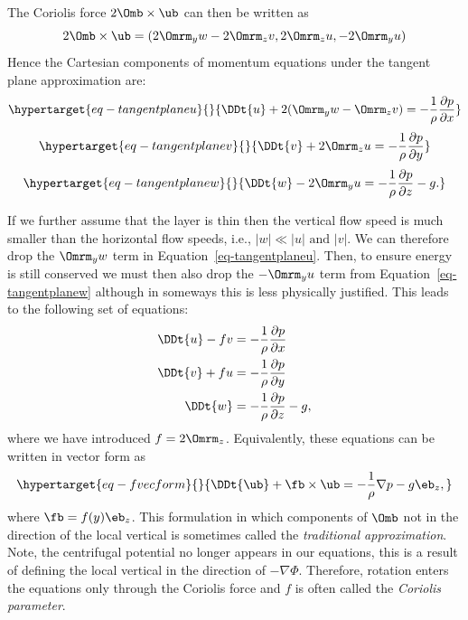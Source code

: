 \documentclass[
  letterpaper,
  twocolumn,
  landscape]{report}
\begin{document}
The Coriolis force \(2\Omb\times \ub\) can then be written as \[
2\Omb\times \ub = (2\Omrm_y w - 2\Omrm_z v, 2\Omrm_z u, -2\Omrm_y u)
\] Hence the Cartesian components of momentum equations under the
tangent plane approximation are:
\begin{equation}\protect\hypertarget{eq-tangentplaneu}{}{ \DDt{u} + 2(\Omrm_yw-\Omrm_zv) = -\frac{1}{\rho}\frac{\partial p}{\partial x} }\label{eq-tangentplaneu}\end{equation}
\begin{equation}\protect\hypertarget{eq-tangentplanev}{}{ \DDt{v} + 2\Omrm_z u = -\frac{1}{\rho}\frac{\partial p}{\partial y} }\label{eq-tangentplanev}\end{equation}
\begin{equation}\protect\hypertarget{eq-tangentplanew}{}{\DDt{w}  -2\Omrm_y u = -\frac{1}{\rho}\frac{\partial p}{\partial z} -g. }\label{eq-tangentplanew}\end{equation}

If we further assume that the layer is thin then the vertical flow speed
is much smaller than the horizontal flow speeds, i.e.,
\(|w| \ll |u| \text{ and } |v|\). We can therefore drop the
\(\Omrm_y w\) term in Equation~\ref{eq-tangentplaneu}. Then, to ensure
energy is still conserved we must then also drop the \(-\Omrm_y u\) term
from Equation~\ref{eq-tangentplanew} although in someways this is less
physically justified. This leads to the following set of equations:
\begin{align}
\DDt{u} -fv &= -\frac{1}{\rho}\frac{\partial p}{\partial x} \\
\DDt{v} + fu &= -\frac{1}{\rho}\frac{\partial p}{\partial y} \\
\DDt{w}   &= -\frac{1}{\rho}\frac{\partial p}{\partial z} -g,
\end{align} where we have introduced \(f=2\Omrm_z\). Equivalently, these
equations can be written in vector form as
\begin{equation}\protect\hypertarget{eq-fvecform}{}{
\DDt{\ub} + \fb\times\ub = -\frac{1}{\rho}\nabla p -g\eb_z,
}\label{eq-fvecform}\end{equation} where \(\fb=f(y)\eb_z\). This
formulation in which components of \(\Omb\) not in the direction of the
local vertical is sometimes called the \emph{traditional approximation}.
Note, the centrifugal potential no longer appears in our equations, this
is a result of defining the local vertical in the direction of
\(-\nabla\Phi\). Therefore, rotation enters the equations only through
the Coriolis force and \(f\) is often called the \emph{Coriolis
parameter}.
\end{document}
